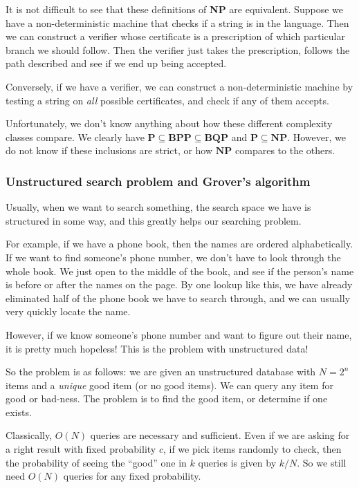 It is not difficult to see that these definitions of \textbf{NP} are equivalent. Suppose we have a non-deterministic machine that checks if a string is in the language. Then we can construct a verifier whose certificate is a prescription of which particular branch we should follow. Then the verifier just takes the prescription, follows the path described and see if we end up being accepted.

Conversely, if we have a verifier, we can construct a non-deterministic machine by testing a string on \emph{all} possible certificates, and check if any of them accepts.

Unfortunately, we don't know anything about how these different complexity classes compare. We clearly have $\mathbf{P} \subseteq \mathbf{BPP} \subseteq \mathbf{BQP}$ and $\mathbf{P} \subseteq \mathbf{NP}$. However, we do not know if these inclusions are strict, or how $\mathbf{NP}$ compares to the others.

\subsubsection*{Unstructured search problem and Grover's algorithm}
Usually, when we want to search something, the search space we have is structured in some way, and this greatly helps our searching problem.

For example, if we have a phone book, then the names are ordered alphabetically. If we want to find someone's phone number, we don't have to look through the whole book. We just open to the middle of the book, and see if the person's name is before or after the names on the page. By one lookup like this, we have already eliminated half of the phone book we have to search through, and we can usually very quickly locate the name.

However, if we know someone's phone number and want to figure out their name, it is pretty much hopeless! This is the problem with unstructured data!

So the problem is as follows: we are given an unstructured database with $N = 2^n$ items and a \emph{unique} good item (or no good items). We can query any item for good or bad-ness. The problem is to find the good item, or determine if one exists.

Classically, $O(N)$ queries are necessary and sufficient. Even if we are asking for a right result with fixed probability $c$, if we pick items randomly to check, then the probability of seeing the ``good'' one in $k$ queries is given by $k/N$. So we still need $O(N)$ queries for any fixed probability.

